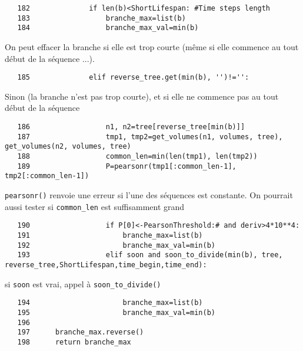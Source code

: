 \documentclass{article}
\def \mycolor {red}
\begin{document}
\begin{verbatim}
   182	            if len(b)<ShortLifespan: #Time steps length 
   183	                branche_max=list(b)
   184	                branche_max_val=min(b)
\end{verbatim} 
\color{\mycolor}
On peut effacer la branche si elle est trop courte (m\^eme si elle commence au tout d\'ebut de la s\'equence ...).
\color{black}
\begin{verbatim}
   185	            elif reverse_tree.get(min(b), '')!='':
\end{verbatim} 
\color{\mycolor}
Sinon (la branche n'est pas trop courte), et si elle ne commence pas au tout d\'ebut de la s\'equence
\color{black}
\begin{verbatim}
   186	                n1, n2=tree[reverse_tree[min(b)]]
   187	                tmp1, tmp2=get_volumes(n1, volumes, tree), get_volumes(n2, volumes, tree)
   188	                common_len=min(len(tmp1), len(tmp2))
   189	                P=pearsonr(tmp1[:common_len-1], tmp2[:common_len-1])
\end{verbatim} 
\color{\mycolor}
\verb|pearsonr()| renvoie une erreur si l'une des s\'equences est constante. On pourrait aussi tester si \verb|common_len| est suffisamment grand
\color{black}
\begin{verbatim}
   190	                if P[0]<-PearsonThreshold:# and deriv>4*10**4:
   191	                    branche_max=list(b)
   192	                    branche_max_val=min(b)
   193	                elif soon and soon_to_divide(min(b), tree, reverse_tree,ShortLifespan,time_begin,time_end):
\end{verbatim} 
\color{\mycolor}
si \verb|soon| est vrai, appel \`a \verb|soon_to_divide()|
\color{black}
\begin{verbatim}
   194	                    branche_max=list(b)
   195	                    branche_max_val=min(b)
   196	
   197	    branche_max.reverse()
   198	    return branche_max
\end{verbatim}
\end{document}
